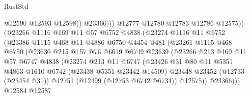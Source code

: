 \begin{lexlean}{RustStd}
\begin{coremodule}
{\begin{coremodule}
{{{{{{{{{{{{{{{{{{{{{{{{{{{{{{{{{{{{{{{{{{{{{{{{{{{{{{{{{{{{{{{{{{{{{{{{{{{{{{{{                                    @12590
                                    @12593
                                    @12598))
                                @23366)))
                          @12777
                          @12780
                          @12783
                          @12786
                          @12575))
                      (@23266
                        @1116
                        @169
                        @11
                        @57
                        @6752
                        @4838
                        (@23274
                          @1116
                          @11
                          @6752
                          (@23386
                            @1115
                            @468
                            @11
                            @4886
                            @6750
                            @4454
                            @481
                            (@23261
                              @1115
                              @468
                              @6750
                              (@23630
                                @215
                                @157
                                @76
                                @6619
                                @6749
                                @23639
                                (@23266
                                  @213
                                  @169
                                  @11
                                  @57
                                  @6747
                                  @4838
                                  (@23274
                                    @213
                                    @11
                                    @6747
                                    (@23426
                                      @31
                                      @80
                                      @11
                                      @5351
                                      @4863
                                      @1610
                                      @6742
                                      (@23438 @5351 @23442 @14509)
                                      @23448
                                      @23452
                                      (@12733 (@23454 @31))
                                      @12751
                                      (@12499 (@12753 @6742 @6734))
                                      @12575))
                                  @23366)))
                            @12584
                            @12587
}}}}}}}}}}}}}}}}}}}}}}}}}}}}}}}}}}}}}}}}}}}}}}}}}}}}}}}}}}}}}}}}}}}}}}}}}}}}}}}}
\end{coremodule}}
\end{coremodule}
\end{lexlean}
